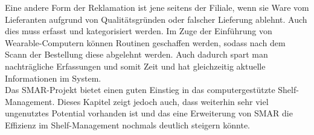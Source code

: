 Eine andere Form der Reklamation ist jene seitens der Filiale, wenn sie Ware vom Lieferanten aufgrund von Qualitätsgründen oder falscher Lieferung ablehnt. Auch dies muss erfasst und kategorisiert werden. Im Zuge der Einführung von Wearable-Computern können Routinen geschaffen werden, sodass nach dem Scann der Bestellung diese abgelehnt werden. Auch dadurch spart man nachträgliche Erfassungen und somit Zeit und hat gleichzeitig aktuelle Informationen im System.\\

Das \ac{SMAR}-Projekt bietet einen guten Einstieg in das computergestützte Shelf-Management. Dieses Kapitel zeigt jedoch auch, dass weiterhin sehr viel ungenutztes Potential vorhanden ist und das eine Erweiterung von \ac{SMAR} die Effizienz im Shelf-Management nochmals deutlich steigern könnte.
%
